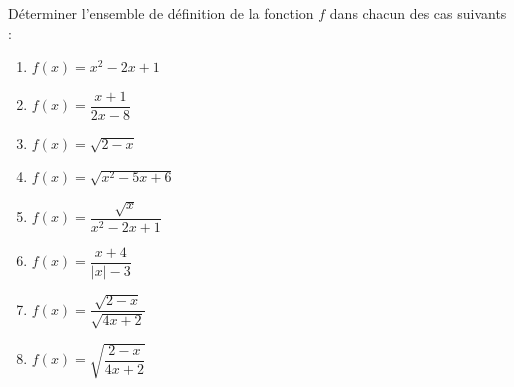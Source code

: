 \begin{Application}[][10 min]
Déterminer l'ensemble de définition de la fonction $f$ dans chacun des cas suivants :
\begin{enumerate}
    \item $f(x) = x^2 - 2x + 1$
    \item $f(x) = \dfrac{x+1}{2x-8}$
    \item $f(x) = \sqrt{2-x}$
    \item $f(x) = \sqrt{x^2 - 5x + 6}$
    \item $f(x) = \dfrac{\sqrt{x}}{x^2 - 2x + 1}$
    \item $f(x) = \dfrac{x+4}{|x| - 3}$
    \item $f(x) = \dfrac{\sqrt{2-x}}{\sqrt{4x+2}}$
    \item $f(x) = \sqrt{\dfrac{2-x}{4x+2}}$
\end{enumerate}
\end{Application}
